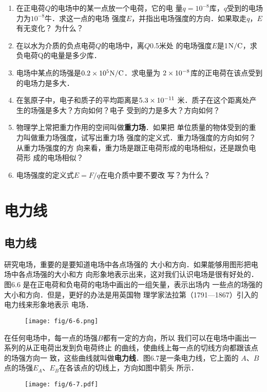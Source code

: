\begin{enumerate}
	\item 在正电荷$Q$的电场中的某一点放一个电荷，它的电
	量$q=10^{-8}$库，$q$受到的电场力为$10^{-8}$牛．求这一点的电场
	强度$E$，并指出电场强度的方向．如果取走$q$，$E$有无变化？
	为什么？
	\item 在以水为介质的负点电荷$Q$的电场中，离$Q$0.5米处
	的电场强度$E$是1$\text{N}/\text{C}$，求负电荷Q的电量是多少库．
	\item 电场中某点的场强是$0.2\times10^5\text{N}/\text{C}$．求电量为
	$2\times10^{-8}$库的正电荷在该点受到的电场力是多大．
	\item 在氢原子中，电子和质子的平均距离是$5.3\times10^{-11}$
	米．质子在这个距离处产生的场强是多大？方向如何？电子
	受到的力是多大？方向如何？
	\item 物理学上常把重力作用的空间叫做\textbf{重力场}．如果把
	单位质量的物体受到的重力叫做重力场强度，试写出重力场
	强度的定义式．重力场强度的方向如何？从重力场强度的方
	向来看，重力场是跟正电荷形成的电场相似，还是跟负电荷形
成的电场相似？
\item 电场强度的定义式$E=F/q$在电介质中要不要改
写？为什么？
\end{enumerate}


\section{电力线}
\subsection{电力线}

研究电场，重要的是要知道电场中各点场强的
大小和方向．如果能够用图形把电场中各点场强的大小和方
向形象地表示出来，这对我们认识电场是很有好处的．图6.6
是在正电荷和负电荷的电场中画出的一组矢量，表示出场内
一些点的场强的大小和方向．但是，更好的办法是用英国物
理学家法拉第（1791—1867）引入的电力线来形象地表示
电场．
\begin{figure}[htp]\centering
	\texttt{[image: fig/6-6.png]}
	\caption{}
	\end{figure}

在任何电场中，每一点的场强$B$都有一定的方向，所以
我们可以在电场中画出一系列的从正电荷出发到负电荷终止
的曲线，使曲线上每一点的切线方向都跟该点的场强方向一
致，这些曲线就叫做\textbf{电力线}．图6.7是一条电力线，它上面的
$A$、$B$点的场强$E_A$、$E_B$在各该点的切线上，方向如图中箭头
所示．
\begin{figure}[htp]\centering
	\texttt{[image: fig/6-7.pdf]}
	\caption{}
	\end{figure}

